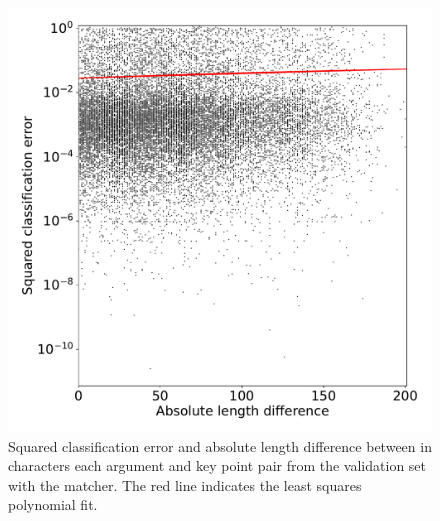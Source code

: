 \begin{figure}
    \includegraphics[width=\linewidth]{classification-error-length-difference-bert-train.pdf}
    \vspace*{-5ex}
    \caption{Squared classification error and absolute length difference between in characters each argument and key point pair from the validation set with the \BertBase matcher. The red line indicates the least squares polynomial fit.}
    \label{classification-error-length}
\end{figure}
